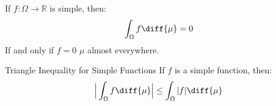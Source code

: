         \begin{theorem}
            If $f:\Omega\rightarrow\mathbb{R}$ is
            simple, then:
            \begin{equation}
                \int_{\Omega}f\diff{\mu}=0
            \end{equation}
            If and only if $f=0$ $\mu$ almost everywhere.
        \end{theorem}
        \begin{ftheorem}
              {Triangle Inequality
               for Simple Functions}{}
            If $f$ is a simple function, then:
            \begin{equation}
                \Big|\int_{\Omega}f\diff{\mu}\Big|
                \leq\int_{\Omega}|f|\diff{\mu}
            \end{equation}
        \end{ftheorem}
